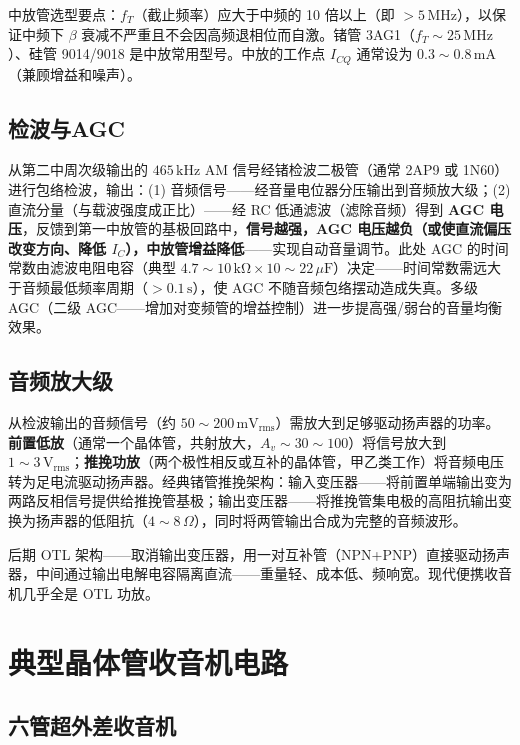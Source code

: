 \documentclass[12pt,UTF8]{ctexbook}
\begin{document}
中放管选型要点：$f_T$（截止频率）应大于中频的 10 倍以上（即 $>5\,\mathrm{MHz}$），以保证中频下 $\beta$ 衰减不严重且不会因高频退相位而自激。锗管 3AG1（$f_T\sim25\,\mathrm{MHz}$）、硅管 9014/9018 是中放常用型号。中放的工作点 $I_{CQ}$ 通常设为 $0.3\sim0.8\,\mathrm{mA}$（兼顾增益和噪声）。

\subsection{检波与AGC}

从第二中周次级输出的 $465\,\mathrm{kHz}$ AM 信号经锗检波二极管（通常 2AP9 或 1N60）进行包络检波，输出：(1) 音频信号——经音量电位器分压输出到音频放大级；(2) 直流分量（与载波强度成正比）——经 RC 低通滤波（滤除音频）得到 \textbf{AGC 电压}，反馈到第一中放管的基极回路中，\textbf{信号越强，AGC 电压越负（或使直流偏压改变方向、降低 $I_C$），中放管增益降低}——实现自动音量调节。此处 AGC 的时间常数由滤波电阻电容（典型 $4.7\sim10\,\mathrm{k\Omega}\times10\sim22\,\mu\mathrm{F}$）决定——时间常数需远大于音频最低频率周期（$>0.1\,\mathrm{s}$），使 AGC 不随音频包络摆动造成失真。多级 AGC（二级 AGC——增加对变频管的增益控制）进一步提高强/弱台的音量均衡效果。

\subsection{音频放大级}

从检波输出的音频信号（约 $50\sim200\,\mathrm{mV_{rms}}$）需放大到足够驱动扬声器的功率。\textbf{前置低放}（通常一个晶体管，共射放大，$A_v\sim30\sim100$）将信号放大到 $1\sim3\,\mathrm{V_{rms}}$；\textbf{推挽功放}（两个极性相反或互补的晶体管，甲乙类工作）将音频电压转为足电流驱动扬声器。经典锗管推挽架构：输入变压器——将前置单端输出变为两路反相信号提供给推挽管基极；输出变压器——将推挽管集电极的高阻抗输出变换为扬声器的低阻抗（$4\sim8\,\Omega$），同时将两管输出合成为完整的音频波形。

后期 OTL 架构——取消输出变压器，用一对互补管（NPN+PNP）直接驱动扬声器，中间通过输出电解电容隔离直流——重量轻、成本低、频响宽。现代便携收音机几乎全是 OTL 功放。

\section{典型晶体管收音机电路}
\label{sec:typical_transistor_radio}

\subsection{六管超外差收音机}
\end{document}
